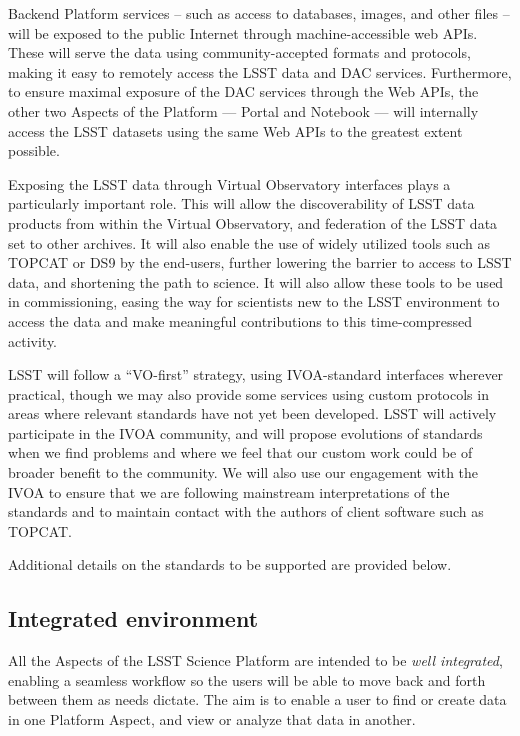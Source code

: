 Backend Platform services -- such as access to
databases, images, and other files -- will be exposed to the public Internet through
machine-accessible web APIs.
These will serve the data using community-accepted
formats and protocols, making it easy to remotely access the LSST data and DAC	
services.
Furthermore, to ensure maximal exposure of the DAC services through the Web APIs,
the other two Aspects of the Platform --- Portal and Notebook --- will
internally access the LSST datasets using the same Web APIs to the greatest extent possible.

Exposing the LSST data through Virtual Observatory interfaces plays a particularly important role.
This will allow the discoverability of LSST data products from within the Virtual Observatory,
and federation of the LSST data set to other archives.
It will also enable the use of widely utilized tools such as TOPCAT or DS9 by the end-users,
further lowering the barrier to access to LSST data, and shortening the path to science.
It will also allow these tools to be used in commissioning,
easing the way for scientists new to the LSST environment to access the data and make meaningful
contributions to this time-compressed activity.

LSST will follow a ``VO-first'' strategy, using IVOA-standard interfaces wherever practical,
though we may also provide some services using custom protocols in areas where relevant standards have not yet been developed.
LSST will actively participate in the IVOA community, and will propose evolutions of standards when we find problems and where we feel that our custom work could be of broader benefit to the community.
We will also use our engagement with the IVOA to ensure that we are following mainstream interpretations of the standards and to maintain contact with the authors of client software such as TOPCAT.

Additional details on the standards to be supported are provided below.

\subsection{Integrated environment}

All the Aspects of the LSST Science Platform are intended to be \textit{well integrated}, enabling a seamless workflow so the users will be able to move back and forth between them as needs dictate.
The aim is to enable a user to find or create data in one Platform Aspect, and view or analyze that data in another.

